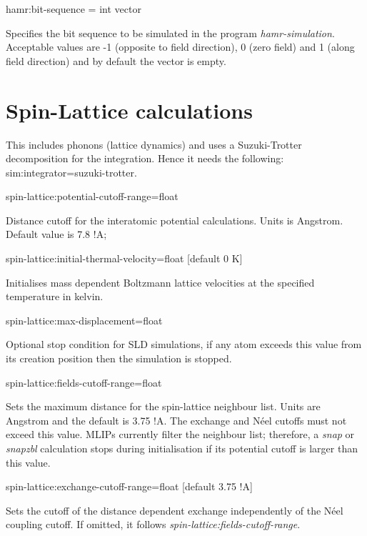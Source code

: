 {\zicf hamr:bit-sequence = int vector}
Specifies the bit sequence to be simulated in the program \textit{hamr-simulation}.
Acceptable values are -1 (opposite to field direction), 0 (zero field) and 1 (along field direction) and by default the vector is empty.

\section*{Spin-Lattice calculations}
This includes phonons (lattice dynamics) and uses a Suzuki-Trotter decomposition for the integration. Hence it needs the following:
sim:integrator=suzuki-trotter.

{\zicf spin-lattice:potential-cutoff-range=float}
Distance cutoff for the interatomic potential calculations. Units is Angstrom.  Default value is 7.8 !A;

{\zicf spin-lattice:initial-thermal-velocity=float [default 0 K]}
Initialises mass dependent Boltzmann lattice velocities at the specified temperature in kelvin.

{\zicf spin-lattice:max-displacement=float}
Optional stop condition for SLD simulations, if any atom exceeds this value from its creation position then the simulation is stopped.

{\zicf spin-lattice:fields-cutoff-range=float}
Sets the maximum distance for the spin-lattice neighbour list. Units are Angstrom and the default is 3.75 !A.
The exchange and N\'eel cutoffs must not exceed this value. MLIPs currently filter the neighbour list; therefore, a \textit{snap} or \textit{snapzbl} calculation stops during initialisation if its potential cutoff is larger than this value.

{\zicf spin-lattice:exchange-cutoff-range=float [default 3.75 !A]}
Sets the cutoff of the distance dependent exchange independently of the N\'eel coupling cutoff. If omitted, it follows \textit{spin-lattice:fields-cutoff-range}.

